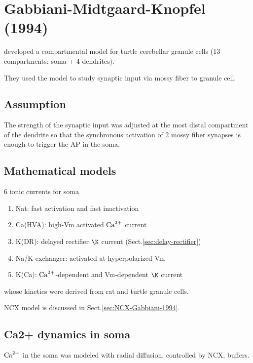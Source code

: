 \section{Gabbiani-Midtgaard-Knopfel (1994)}
\label{sec:granule-cell-Gabbiani-1994}

\citep{gabbiani1994} developed a compartmental model for turtle cerebellar
granule cells (13 compartments: soma + 4 dendrites).

They used the model to study synaptic input via mossy fiber to granule cell.

\subsection{Assumption}

The strength of the synaptic input was adjusted at the most distal compartment
of the dendrite so that the synchronous activation of 2 mossy fiber synapses
is enough to trigger the AP in the soma.



\subsection{Mathematical models}

6 ionic currents for soma
\begin{enumerate}
  \item Nat: fast activation and fast inactivation
  
  \item Ca(HVA):  high-Vm activated ${\text{Ca}^{2+}}$ current
  
  \item K(DR): delayed rectifier $\K$ current (Sect.\ref{sec:delay-rectifier})
  
  \item Na/K exchanger: activated at hyperpolarized Vm
  
  \item K(Ca): ${\text{Ca}^{2+}}$-dependent and Vm-dependent $\K$ current
\end{enumerate}
whose kinetics were derived from rat and turtle granule cells.

NCX model is discussed in Sect.\ref{sec:NCX-Gabbiani-1994}.

\subsection{Ca2+ dynamics in soma}

${\text{Ca}^{2+}}$ in the soma was modeled with radial diffusion, controlled by NCX, buffers.



